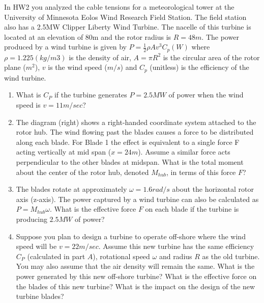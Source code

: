 
In HW2 you analyzed the cable tensions for a meteorological tower at the University of Minnesota Eolos Wind
Research Field Station. The field station also has a 2.5MW Clipper Liberty Wind Turbine. The nacelle of this
turbine is located at an elevation of 80m and the rotor radius is $R = 48m$. The power produced by a wind
turbine is given by $P = \frac{1}{2}\rho A v^3 C_p (W)$ where $\rho = 1.225 (kg/m3)$ is the density of air, $A = \pi R^2$ is the circular
area of the rotor plane ($m^2$), $v$ is the wind speed ($m/s$) and $C_p$ (unitless) is the efficiency of the wind turbine.
\begin{enumerate}
  \item What is $C_P$ if the turbine generates $P = 2.5MW$ of power when the wind speed is $v = 11 m/sec$?
  \item The diagram (right) shows a right-handed coordinate system attached to the rotor hub. The wind flowing
past the blades causes a force to be distributed along each blade. For Blade 1 the effect is equivalent to a
single force F acting vertically at mid span ($x = 24m$). Assume a similar force acts perpendicular to the
other blades at midspan. What is the total moment about the center of the rotor hub, denoted $M_{hub}$, in
terms of this force $F$?
  \item The blades rotate at approximately $\omega = 1.6 rad/s$ about the horizontal rotor axis (z-axis). The power 
captured by a wind turbine can also be calculated as $P = M_{hub} \omega$. What is the effective force $F$ on each
blade if the turbine is producing $2.5 MW$ of power?
  \item Suppose you plan to design a turbine to operate off-shore where the wind speed will be $v = 22 m/sec$.
Assume this new turbine has the same efficiency $C_P$ (calculated in part $A$), rotational speed $\omega$ and radius
$R$ as the old turbine. You may also assume that the air density will remain the same. What is the power
generated by this new off-shore turbine? What is the effective force on the blades of this new turbine?
What is the impact on the design of the new turbine blades?
\end{enumerate}


